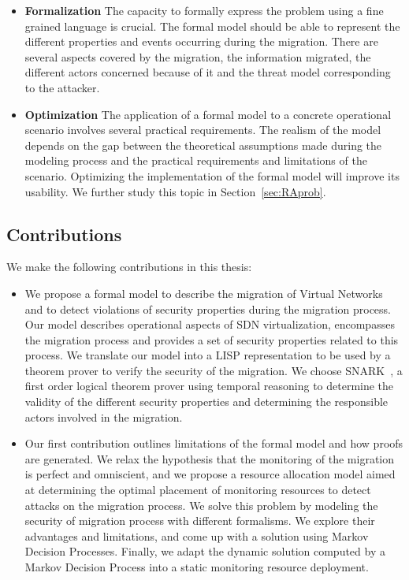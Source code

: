 \begin{itemize}
    \item \textbf{Formalization } The capacity to formally express the problem using a fine grained language is crucial. The formal model should be able to represent the different properties and events occurring during the migration.
    There are several aspects covered by the migration, the information migrated, the different actors concerned because of it and the threat model corresponding to the attacker.

    \item \textbf{Optimization} The application of a formal model to a concrete operational scenario involves several practical requirements. The realism of the model depends on the gap between the theoretical assumptions made during the modeling process and the practical requirements and limitations of the scenario. Optimizing the implementation of the formal model will improve its usability.
    We further study this topic in Section~\ref{sec:RAprob}.
    
    
\end{itemize}


\subsection{Contributions}
We make the following contributions in this thesis:

\begin{itemize}
    \item We propose a formal model to describe the migration of Virtual Networks and to detect violations of security properties during the migration process.
    Our model describes operational aspects of SDN virtualization, encompasses the migration process and provides a set of security properties related to this process. We translate our model into a LISP representation to be used by a theorem prover to verify the security of the migration. We choose SNARK~\cite{snark-Stickel2000}, a first order logical theorem prover using temporal reasoning to determine the validity of the different security properties and determining the responsible actors involved in the migration.
    
    \item Our first contribution outlines limitations of the formal model and how proofs are generated. We relax the hypothesis that the monitoring of the migration is perfect and omniscient, and we propose a resource allocation model aimed at determining the optimal placement of monitoring resources to detect attacks on the migration process. We solve this problem by modeling the security of migration process with different formalisms. We explore their advantages and limitations, and come up with a solution using Markov Decision Processes. Finally, we adapt the dynamic solution computed by a Markov Decision Process into a static monitoring resource deployment.
\end{itemize}

